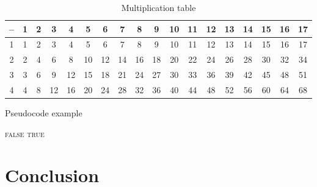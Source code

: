 \documentclass{nus-student-qe}
\begin{document}
	\begin{table}[!h]
		\caption{Multiplication table}
		\label{table:mul-table}
		\centering
		\begin{tabular}{|*{18}{c|}}\hline
			-- & 1 & 2 & 3 & 4 & 5 & 6 & 7 & 8 & 9 & 10 & 11 & 12 & 13 & 14 & 15 & 16 & 17 \\\hline
			1  & 1 & 2 & 3 & 4 & 5 & 6 & 7 & 8 & 9 & 10 & 11 & 12 & 13 & 14 & 15 & 16 & 17 \\\hline
			2  & 2 & 4 & 6 & 8 & 10 & 12 & 14 & 16 & 18 & 20 & 22 & 24 & 26 & 28 & 30 & 32 & 34 \\\hline
			3  & 3 & 6 & 9 & 12 & 15 & 18 & 21 & 24 & 27 & 30 & 33 & 36 & 39 & 42 & 45 & 48 & 51 \\\hline
			4  & 4 & 8 & 12 & 16 & 20 & 24 & 28 & 32 & 36 & 40 & 44 & 48 & 52 & 56 & 60 & 64 & 68 \\\hline
		\end{tabular}
	\end{table}
	
	\begin{algorithm}[!h]
		\caption{Pseudocode example}
		\label{alg:pseudocode}
		\begin{algorithmic}
			\State\Return \textsc{false}
			\EndIf
			\EndFor
			\State\Return \textsc{true}
			\EndFunction
		\end{algorithmic}
	\end{algorithm}
	
	\chapter{Conclusion}
	\lipsum[1]
	
	
\end{document}
